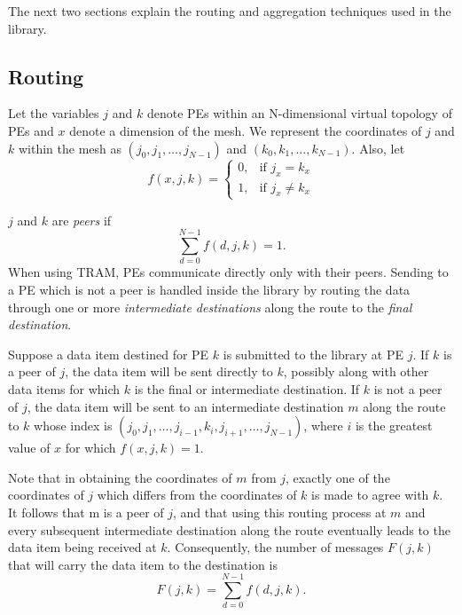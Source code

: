 
The next two sections explain the routing and aggregation techniques
used in the library.

\subsection{Routing}

Let the variables $j$ and $k$ denote PEs within an N-dimensional
virtual topology of PEs and $x$ denote a dimension of the mesh. We
represent the coordinates of $j$ and $k$ within the mesh as $\left
(j_0, j_1, \ldots, j_{N-1} \right) $ and $ \left (k_0, k_1, \ldots,
k_{N-1} \right) $.  Also, let
\[
f(x, j, k) =
\begin{cases}
0, & \text{if } j_x = k_x \\
1, & \text{if } j_x \ne k_x
\end{cases}
\]

$j$ and $k$ are \emph{peers} if
\begin{equation}
\sum_{d=0}^{N-1} f(d, j, k) = 1 .
\label{eq:peer}
\end{equation}
When using TRAM, PEs communicate directly only with their
peers. Sending to a PE which is not a peer is handled inside the
library by routing the data through one or more \emph{intermediate
  destinations} along the route to the \emph{final destination}.

Suppose a data item destined for PE $k$ is submitted to the library at
PE $j$. If $k$ is a peer of $j$, the data item will be sent directly
to $k$, possibly along with other data items for which $k$ is the
final or intermediate destination.  If $k$ is not a peer of $j$, the
data item will be sent to an intermediate destination $m$ along the
route to $k$ whose index is $\left (j_0, j_1, \ldots, j_{i-1}, k_i,
j_{i+1}, \ldots, j_{N-1} \right)$, where $i$ is the greatest value of
$x$ for which $f(x, j, k) = 1$.

Note that in obtaining the coordinates of $m$ from $j$, exactly one of
the coordinates of $j$ which differs from the coordinates of $k$ is
made to agree with $k$. It follows that m is a peer of $j$, and that
using this routing process at $m$ and every subsequent intermediate
destination along the route eventually leads to the data item being
received at $k$. Consequently, the number of messages $F(j, k)$ that
will carry the data item to the destination is
\begin{equation}
F(j,k) = \sum_{d=0}^{N-1}f(d, j, k) .
\label{eq:nummsgs}
\end{equation}

